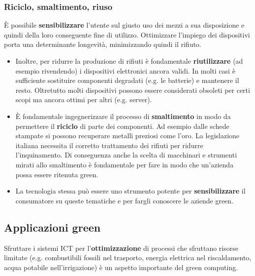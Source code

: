 \subsubsection{Riciclo, smaltimento, riuso}
È possibile \textbf{sensibilizzare} l'utente sul giusto uso dei mezzi a sua disposizione e quindi della loro conseguente fine di utilizzo. Ottimizzare l'impiego dei dispositivi porta una determinante longevità, minimizzando quindi il rifiuto.
\begin{itemize}
	\item Inoltre, per ridurre la produzione di rifiuti è fondamentale \textbf{riutilizzare} (ad esempio rivendendo) i dispositivi elettronici ancora validi. In molti casi è sufficiente sostituire componenti degradati (e.g. le batterie) e mantenere il resto. Oltretutto molti dispositivi possono essere considerati obsoleti per certi scopi ma ancora ottimi per altri (e.g. server).
	\item È fondamentale ingegnerizzare il processo di \textbf{smaltimento} in modo da permettere il \textbf{riciclo} di parte dei componenti. Ad esempio dalle schede stampate si possono recuperare metalli preziosi come l'oro. La legislazione italiana necessita il corretto trattamento dei rifiuti per ridurre l'inquinamento. Di conseguenza anche la scelta di macchinari e strumenti mirati allo smaltimento è fondamentale per fare in modo che un'azienda possa essere ritenuta green.
	\item La tecnologia stessa può essere uno strumento potente per \textbf{sensibilizzare} il consumatore su queste tematiche e per fargli conoscere le aziende green.
\end{itemize}
\subsection{Applicazioni green}
Sfruttare i sistemi ICT per l'\textbf{ottimizzazione} di processi che sfruttano risorse limitate (e.g. combustibili fossili nel trasporto, energia elettrica nel riscaldamento, acqua potabile nell'irrigazione) è un aspetto importante del green computing.